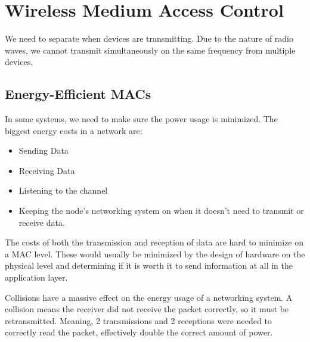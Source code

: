 \section{Wireless Medium Access Control}\label{sec:Wireless_MAC}
We need to separate when devices are transmitting.
Due to the nature of radio waves, we cannot transmit simultaneously on the same frequency from multiple devices.







\subsection{Energy-Efficient MACs}\label{subsec:Energy_Efficient_MACs}
In some systems, we need to make sure the power usage is minimized.
The biggest energy costs in a network are:
\begin{itemize}[noitemsep]
\item Sending Data
\item Receiving Data
\item Listening to the channel
\item Keeping the node's networking system on when it doesn't need to transmit or receive data.
\end{itemize}

\begin{remark*}
  The costs of both the transmission and reception of data are hard to minimize on a MAC level.
  These would usually be minimized by the design of hardware on the physical level and determining if it is worth it to send information at all in the application layer.
\end{remark*}

\begin{remark*}
  Collisions have a massive effect on the energy usage of a networking system.
  A collision means the receiver did not receive the packet correctly, so it must be retransmitted.
  Meaning, 2 transmissions and 2 receptions were needed to correctly read the packet, effectively double the correct amount of power.
\end{remark*}


